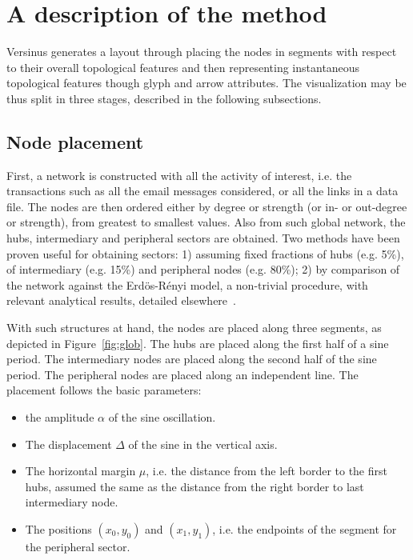 \documentclass[runningheads]{llncs}
\begin{document}
\section{A description of the method}\label{sec:des}
Versinus generates a layout through placing the nodes in segments
with respect to their overall topological features and then representing
instantaneous topological features though glyph and arrow attributes.
The visualization may be thus split in three stages, described in the following subsections.

\subsection{Node placement}\label{sec:pla}
First, a network is constructed with all the activity of interest, i.e. the transactions such as all the email messages considered, or all the links in a data file.
The nodes are then ordered either by degree or strength (or in- or out-degree or strength), from greatest to smallest values.
Also from such global network, the hubs, intermediary and peripheral sectors are obtained. Two methods have been proven useful for obtaining sectors: 1) assuming fixed fractions of hubs (e.g. 5\%), of intermediary (e.g. 15\%) and peripheral nodes (e.g. 80\%); 2) by comparison of the network against the Erdös-Rényi model, a non-trivial procedure, with relevant analytical results, detailed elsewhere~\cite{stab}.

With such structures at hand, the nodes are placed along three segments, as depicted in Figure~\ref{fig:glob}.
The hubs are placed along the first half of a sine period.
The intermediary nodes are placed along the second half of the sine period.
The peripheral nodes are placed along an independent line.
The placement follows 
the basic parameters:
\begin{itemize}
  \item the amplitude $\alpha$ of the sine oscillation.
  \item The displacement $\Delta$ of the sine in the vertical axis.
  \item The horizontal margin $\mu$, i.e. the distance from the left border to the first hubs, assumed the same as the distance from the right border to last intermediary node.
  \item The positions $(x_0,y_0)$ and $(x_1,y_1)$, i.e. the endpoints of the segment for the peripheral sector.
\end{itemize}
\end{document}
